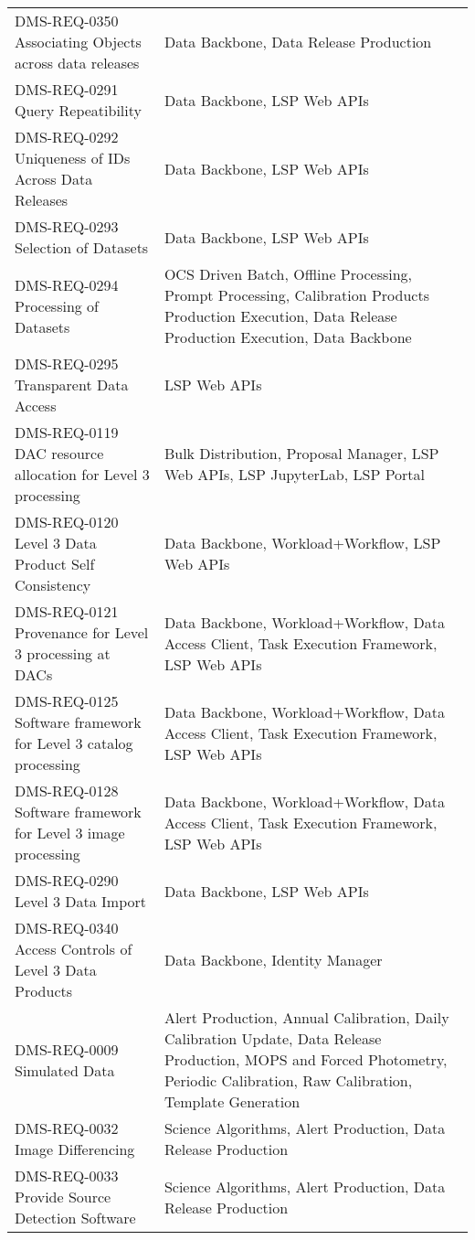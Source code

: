 \begin{xtabular}{p{0.4\textwidth}p{0.55\textwidth}}
&\\ \hline
DMS-REQ-0350 Associating Objects across data releases & Data Backbone,
Data Release Production\\ \hline
DMS-REQ-0291 Query Repeatibility & Data Backbone, LSP Web APIs\\ \hline
DMS-REQ-0292 Uniqueness of IDs Across Data Releases & Data Backbone, LSP Web APIs\\ \hline
DMS-REQ-0293 Selection of Datasets & Data Backbone, LSP Web APIs\\ \hline
DMS-REQ-0294 Processing of Datasets & OCS Driven Batch, Offline
Processing, Prompt Processing, Calibration Products Production
Execution, Data Release Production Execution, Data
Backbone\\ \hline
DMS-REQ-0295 Transparent Data Access & LSP Web APIs\\ \hline
DMS-REQ-0119 DAC resource allocation for Level 3 processing & Bulk
Distribution, Proposal Manager, LSP Web APIs, LSP JupyterLab, LSP
Portal\\ \hline
DMS-REQ-0120 Level 3 Data Product Self Consistency & Data Backbone,
Workload+Workflow, LSP Web APIs\\ \hline
DMS-REQ-0121 Provenance for Level 3 processing at DACs & Data Backbone,
Workload+Workflow, Data Access Client, Task Execution Framework, LSP Web APIs\\ \hline
DMS-REQ-0125 Software framework for Level 3 catalog processing & Data
Backbone, Workload+Workflow, Data Access Client, Task Execution
Framework, LSP Web APIs\\ \hline
DMS-REQ-0128 Software framework for Level 3 image processing & Data
Backbone, Workload+Workflow, Data Access Client, Task Execution
Framework, LSP Web APIs\\ \hline
DMS-REQ-0290 Level 3 Data Import & Data Backbone, LSP Web APIs\\ \hline
DMS-REQ-0340 Access Controls of Level 3 Data Products & Data Backbone,
Identity Manager\\ \hline
DMS-REQ-0009 Simulated Data & Alert Production, Annual Calibration,
Daily Calibration Update, Data Release Production, MOPS and Forced
Photometry, Periodic Calibration, Raw Calibration, Template
Generation\\ \hline
DMS-REQ-0032 Image Differencing & Science Algorithms, Alert Production,
Data Release Production\\ \hline
DMS-REQ-0033 Provide Source Detection Software & Science Algorithms,
Alert Production, Data Release Production\\ \hline

\end{xtabular}
